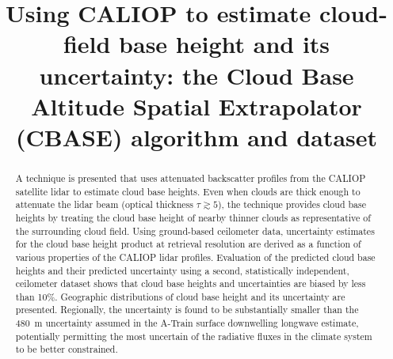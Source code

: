 \documentclass[essd,manuscript]{copernicus}\usepackage[]{graphicx}\usepackage[]{color}
\begin{document}

\title{Using CALIOP to estimate cloud-field base height and its uncertainty: the
  Cloud Base Altitude Spatial Extrapolator (CBASE) algorithm and dataset}













\received{}
\pubdiscuss{} %
\revised{}
\accepted{}
\published{}




\maketitle



\begin{abstract}
  A technique is presented that uses attenuated backscatter profiles from the
  CALIOP satellite lidar to estimate cloud base heights.  Even when clouds are
  thick enough to attenuate the lidar beam (optical thickness $\tau \gtrsim 5$),
  the technique provides cloud base heights by treating the cloud base height of
  nearby thinner clouds as representative of the surrounding cloud field.  Using
  ground-based ceilometer data, uncertainty estimates for the cloud base height
  product at retrieval resolution are derived as a function of various
  properties of the CALIOP lidar profiles.  Evaluation of the predicted cloud
  base heights and their predicted uncertainty using a second, statistically
  independent, ceilometer dataset shows that cloud base heights and
  uncertainties are biased by less than 10\%.  Geographic distributions of cloud
  base height and its uncertainty are presented.  Regionally, the uncertainty is
  found to be substantially smaller than the 480~\unit{m} uncertainty assumed in
  the A-Train surface downwelling longwave estimate, potentially permitting the
  most uncertain of the radiative fluxes in the climate system to be better
  constrained.
\end{abstract}
\end{document}
